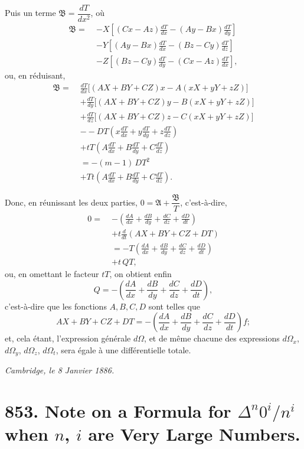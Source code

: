 \documentclass[11pt]{article}
\begin{document}
Puis un terme $\mathfrak{B}=\dfrac{dT}{dx^2}$, o\`u
\begin{align*}
\mathfrak{B} =\; & -X\!\left[(Cx-Az)\frac{dT}{dx}-(Ay-Bx)\frac{dT}{dy}\right]\\
& - Y\!\left[(Ay-Bx)\frac{dT}{dx}-(Bz-Cy)\frac{dT}{dz}\right]\\
& - Z\!\left[(Bz-Cy)\frac{dT}{dy}-(Cx-Az)\frac{dT}{dx}\right],
\end{align*}
ou, en r\'eduisant,
\begin{align*}
\mathfrak{B} =\; & \frac{dT}{dx}\bigl[(AX+BY+CZ)x - A(xX+yY+zZ)\bigr]\\
& + \frac{dT}{dy}\bigl[(AX+BY+CZ)y - B(xX+yY+zZ)\bigr]\\
& + \frac{dT}{dz}\bigl[(AX+BY+CZ)z - C(xX+yY+zZ)\bigr]\\
& - -DT\!\left(x\frac{dT}{dx}+y\frac{dT}{dy}+z\frac{dT}{dz}\right)\\
& + tT\!\left(A\frac{dT}{dx}+B\frac{dT}{dy}+C\frac{dT}{dz}\right)\\
& = -(m-1)\,DT^2\\
& + Tt\!\left(A\frac{dT}{dx}+B\frac{dT}{dy}+C\frac{dT}{dz}\right).
\end{align*}

Donc, en r\'eunissant les deux parties, $0 = \mathfrak{A}+\dfrac{\mathfrak{B}}{T}$, c'est-\`a-dire,
\begin{align*}
0 =\; & -\left(\frac{dA}{dx}+\frac{dB}{dy}+\frac{dC}{dz}+\frac{dD}{dt}\right)\\
& + t\frac{d}{dt}(AX+BY+CZ+DT)\\
& = -T\!\left(\frac{dA}{dx}+\frac{dB}{dy}+\frac{dC}{dz}+\frac{dD}{dt}\right)\\
& + t\,QT,
\end{align*}
ou, en omettant le facteur $tT$, on obtient enfin
\[
Q = -\!\left(\frac{dA}{dx}+\frac{dB}{dy}+\frac{dC}{dz}+\frac{dD}{dt}\right),
\]
c'est-\`a-dire que les fonctions $A, B, C, D$ sont telles que
\[
AX + BY + CZ + DT = -\!\left(\frac{dA}{dx}+\frac{dB}{dy}+\frac{dC}{dz}+\frac{dD}{dt}\right)\!f;
\]
et, cela \'etant, l'expression g\'en\'erale $d\Omega$, et de m\^eme chacune des expressions $d\Omega_x$, $d\Omega_y$, $d\Omega_z$, $d\Omega_t$, sera \'egale \`a une diff\'erentielle totale.

\medskip
\noindent\textit{Cambridge, le 8 Janvier 1886.}

\vfill

\newpage

\section*{853. Note on a Formula for $\Delta^n 0^i/n^i$ when $n$, $i$ are Very Large Numbers.}
\end{document}
